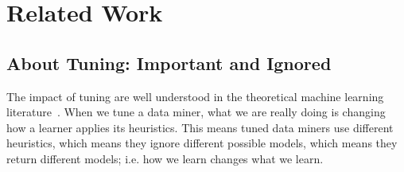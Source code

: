 \documentclass[10pt,conference]{IEEEtran}
\theoremstyle{break}
\begin{document}



\section{Related Work}

\subsection{About Tuning: Important and Ignored}
\label{sect: tuning}

The impact of tuning are well understood in the theoretical machine learning literature~\cite{bergstra2012random}.  When we tune a
data miner, what we are really doing is changing how a learner applies its
heuristics. This means tuned data miners use different heuristics, which means
they ignore different possible models, which means they return different models;
i.e. how we learn changes what we learn.
\end{document}
